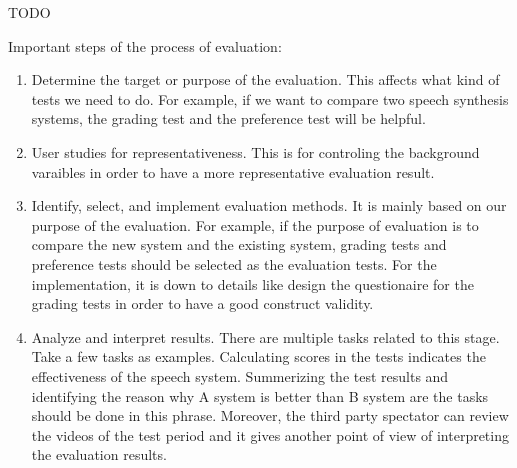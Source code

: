 \documentclass[12pt]{article}
\newenvironment{problem}[2][Problem]{\begin{trivlist}
\item[\hskip \labelsep {\bfseries #1}\hskip \labelsep {\bfseries #2.}]}{\end{trivlist}}
\begin{document}
\begin{problem}{4.2}
    TODO
\end{problem}
\begin{problem}{5.1}
    Important steps of the process of evaluation:
    \begin{enumerate}
        \item Determine the target or purpose of the evaluation. This affects what kind
        of tests we need to do. For example, if we want to compare two
        speech synthesis systems, the grading test and the preference test will
        be helpful.

        \item User studies for representativeness. This is for controling the
        background varaibles in order to have a more representative evaluation
        result.

        \item Identify, select, and implement evaluation methods.
        It is mainly based on our purpose of the evaluation. For example, if the
        purpose of evaluation is to compare the new system and the existing system,
        grading tests and preference tests should be selected as the evaluation
        tests. For the implementation, it is down to details like design the questionaire
        for the grading tests in order to have a good construct validity.

        \item  Analyze and interpret results.
        There are multiple tasks related to this stage. Take a few tasks as examples.
        Calculating scores in the tests indicates the effectiveness of the speech system.
        Summerizing the test results and identifying the reason why A system is
        better than B system are the tasks should be done in this phrase. Moreover,
        the third party spectator can review the videos of the test period and it
        gives another point of view of interpreting the evaluation results.

    \end{enumerate}
\end{problem}
\end{document}

